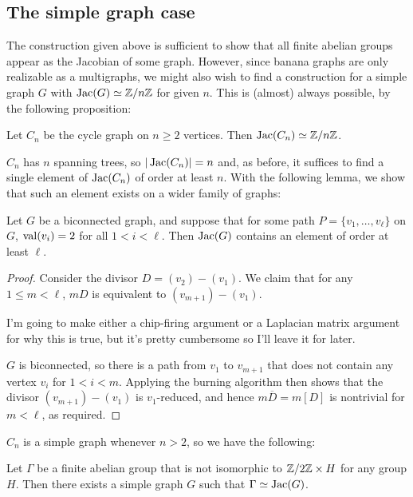 \documentclass{amsart}
\begin{document}
\subsection{The simple graph case}
The construction given above is sufficient to show that all finite
abelian groups appear as the Jacobian of some graph. However, since
banana graphs are only realizable as a multigraphs, we might also wish
to find a construction for a simple graph $G$ with $\operatorname{Jac}(G) \simeq
\mathbb{Z}/n\mathbb{Z}$ for given $n$. This is (almost) always possible, by the
following proposition:

\begin{prop}
  \label{prop:cycle_cyclic}
  Let $C_n$ be the cycle graph on $n \ge 2$ vertices. Then $\operatorname{Jac}(C_n) \simeq
  \mathbb{Z}/n\mathbb{Z}$.
\end{prop}

$C_n$ has $n$ spanning trees, so $|\operatorname{Jac}(C_n)|=n$ and, as before, it
suffices to find a single element of $\operatorname{Jac}(C_n)$ of order at least
$n$. With the following lemma, we show that such an element exists on a wider family of graphs:

\begin{lem}
  \label{lem:2valent_path}
  Let $G$ be a biconnected graph, and suppose that for some path $P =
  \{v_1, \ldots, v_\ell\}$ on $G$, $\operatorname{val}(v_i) = 2$ for all $1 < i <
  \ell$. Then $\operatorname{Jac}(G)$ contains an element of order at least $\ell$.
\end{lem}
\begin{proof}
  Consider the divisor $D = (v_2) - (v_1)$. We claim that for any $1
  \le m < \ell$, $mD$ is equivalent to $(v_{m+1}) - (v_1)$.

  I'm going to make either a chip-firing argument or a Laplacian
  matrix argument for why this is true, but it's pretty cumbersome so
  I'll leave it for later.

  $G$ is biconnected, so there is a path from $v_1$ to $v_{m+1}$ that
  does not contain any vertex $v_i$ for $1 < i < m$. Applying the
  burning algorithm then shows that the divisor $(v_{m+1}) - (v_1)$ is
  $v_1$-reduced, and hence $m\overline{D} = m[D]$ is nontrivial for $m
  < \ell$, as required.
\end{proof}

$C_n$ is a simple graph whenever $n > 2$, so we have the following:

\begin{cor}
  Let $\Gamma$ be a finite abelian group that is not isomorphic to
  $\mathbb{Z}/2\mathbb{Z} \times H$ for any group $H$. Then there exists a simple
  graph $G$ such that $\Gamma \simeq \operatorname{Jac}(G)$.
\end{cor}
\end{document}
